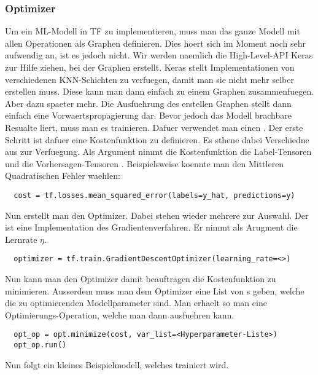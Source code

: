 \subsubsection{Optimizer}
Um ein ML-Modell in TF zu implementieren, muss man das ganze Modell mit
allen Operationen als Graphen definieren. Dies hoert sich im Moment noch sehr
aufwendig an, ist es jedoch nicht. Wir werden naemlich die High-Level-API Keras
zur Hilfe ziehen, bei der Graphen erstellt.
Keras stellt Implementationen von verschiedenen KNN-Schichten zu verfuegen, damit man sie nicht mehr selber
erstellen muss. Diese kann man dann einfach zu einem Graphen zusammenfuegen.
Aber dazu spaeter mehr.
\para{}
Die Ausfuehrung des erstellen Graphen stellt dann einfach eine
Vorwaertspropagierung dar. Bevor jedoch das Modell brachbare Resualte liert,
muss man es trainieren. Dafuer verwendet man einen .
\para{}
Der erste Schritt ist dafuer eine Kostenfunktion zu definieren. Es sthene dabei
Verschiedne aus  zur Verfuegung. Als Argument nimmt die
Kostenfunktion die Label-Tensoren  und die Vorhersagen-Tensoren .
Beispielsweise koennte man den Mittleren Quadratischen Fehler waehlen:
\begin{verbatim}
  cost = tf.losses.mean_squared_error(labels=y_hat, predictions=y)
\end{verbatim}
Nun erstellt man den Optimizer. Dabei stehen wieder mehrere zur Auswahl. Der
 ist eine Implementation des
Gradientenverfahren. Er nimmt als Arugment die Lernrate $\eta$.
\begin{verbatim}
  optimizer = tf.train.GradientDescentOptimizer(learning_rate=<>)
\end{verbatim}
Nun kann man den Optimizer damit beauftragen die Kostenfunktion  zu
minimieren. Ausserdem muss man dem Optimizer eine List von s
geben, welche die zu optimierenden Modellparameter sind.
Man erhaelt so man eine Optimierungs-Operation, welche man dann
ausfuehren kann.
\begin{verbatim}
  opt_op = opt.minimize(cost, var_list=<Hyperparameter-Liste>)
  opt_op.run()
\end{verbatim}
\para{}
Nun folgt ein kleines Beispielmodell, welches trainiert wird.
